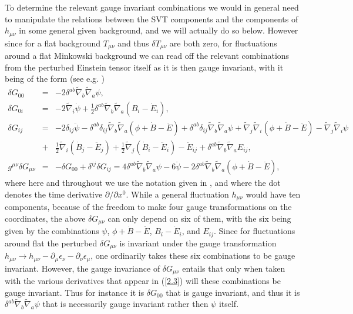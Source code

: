 \documentclass[aps,onecolumn,10pt]{revtex4}
\numberwithin{equation}{section}
\numberwithin{equation}{section}
\begin{document}
To determine  the relevant gauge invariant combinations we would in general need to manipulate the relations between the SVT components and the components of $h_{\mu\nu}$ in some general given background, and we will actually do so below. However since for a flat background $T_{\mu\nu}$ and thus $\delta T_{\mu\nu}$ are both zero, for fluctuations around a flat Minkowski background  we can read off the relevant combinations from the perturbed Einstein tensor itself as it is then gauge invariant, with it being of the form   (see e.g. \cite{Amarasinghe2018})
%
\begin{eqnarray}
\delta G_{00}&=&- 2 \delta^{ab} \tilde{\nabla}_{b}\tilde{\nabla}_{a}\psi,
\nonumber\\
\delta G_{0i}&=&- 2 \tilde{\nabla}_{i}\dot{\psi}+ \tfrac{1}{2} \delta^{ab} \tilde{\nabla}_{b}\tilde{\nabla}_{a}(B_{i} -  \dot{E}_{i}),
\nonumber\\
\delta G_{ij}&=&- 2 \delta_{ij} \ddot{\psi} -  \delta^{ab} \delta_{ij} \tilde{\nabla}_{b}\tilde{\nabla}_{a}(\phi+\dot{B}  -\ddot{E})+ \delta^{ab} \delta_{ij} \tilde{\nabla}_{b}\tilde{\nabla}_{a}\psi 
 + \tilde{\nabla}_{j}\tilde{\nabla}_{i}(\phi+\dot{B} -  \ddot{E})  -  \tilde{\nabla}_{j}\tilde{\nabla}_{i}\psi
\nonumber\\
&+& \tfrac{1}{2} \tilde{\nabla}_{i}(\dot{B}_{j} - \ddot{E}_{j}) + \tfrac{1}{2} \tilde{\nabla}_{j}(\dot{B}_{i}  
- \ddot{E}_{i})- \ddot{E}_{ij} + \delta^{ab} \tilde{\nabla}_{b}\tilde{\nabla}_{a}E_{ij},
\nonumber\\
g^{\mu\nu}\delta G_{\mu\nu}&=&-\delta G_{00}+\delta^{ij}\delta G_{ij}=4 \delta^{ab} \tilde{\nabla}_{b}\tilde{\nabla}_{a}\psi -6\ddot{\psi}-2 \delta^{ab} \tilde{\nabla}_{b}\tilde{\nabla}_{a}(\phi+\dot{B}  -\ddot{E}),
\label{2.3}
\end{eqnarray}
%
where here and throughout we use the notation given in \cite{Weinberg1972}, and where the dot denotes the time derivative $\partial/\partial x^0$. While a general fluctuation $h_{\mu\nu}$ would have ten components, because of the freedom to make four gauge transformations on the coordinates, the above $\delta G_{\mu\nu}$ can only depend on six of them, with the six being given by the combinations $\psi$, $\phi+\dot{B}  -\ddot{E}$, $B_{i} -  \dot{E}_{i}$, and $E_{ij}$. Since for fluctuations around flat the perturbed $\delta G_{\mu\nu}$ is invariant under the gauge transformation $h_{\mu\nu}\rightarrow h_{\mu\nu}-\partial_{\mu}\epsilon_{\nu}-\partial_{\nu}\epsilon_{\mu}$, one ordinarily takes these six combinations to be gauge invariant. However, the gauge invariance of $\delta G_{\mu\nu}$ entails that only when taken with the various derivatives that appear in (\ref{2.3}) will these combinations be gauge invariant. Thus for instance it is $\delta G_{00}$ that is gauge invariant, and thus it is $\delta^{ab} \tilde{\nabla}_{b}\tilde{\nabla}_{a}\psi$ that is necessarily gauge invariant rather then $\psi$ itself. 
\end{document}
